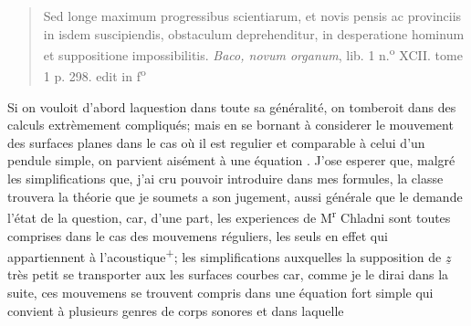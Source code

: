 \documentclass[11pt,a4paper]{article}
\begin{document}
\begin{quote}
Sed longe maximum progressibus scientiarum, et novis pensis ac provinciis in isdem suscipiendis,
obstaculum deprehenditur, in desperatione hominum et suppositione impossibilitis. \emph{Baco, novum organum}, lib. 1
n.\textsuperscript{o} XCII. tome 1 p. 298. edit in f\textsuperscript{o} \ill{}
\end{quote}

Si on vouloit   d'abord  laquestion dans toute sa généralité,
on tomberoit dans des calculs extrèmement compliqués; mais en se
bornant à considerer le mouvement des surfaces planes dans le cas
où il est regulier et comparable à celui d'un pendule simple, on parvient
aisément à une équation . J'ose esperer que, malgré les
simplifications que,    j'ai cru pouvoir introduire dans mes formules,
la classe trouvera la théorie que  je  soumets a son
jugement, aussi générale que le demande l'état de la question,
car, d'une part, les experiences de M\textsuperscript{r} Chladni sont toutes comprises
dans le cas des mouvemens réguliers, les seuls en effet qui appartiennent
à l'acoustique\textsuperscript{+};    les simplifications auxquelles
 la supposition de $\underline{z}$ très petit    se transporter
aux  
les surfaces courbes car, comme je le dirai dans la suite, ces
mouvemens se trouvent compris dans une équation fort
simple qui convient à plusieurs genres de corps sonores et dans laquelle
\end{document}
